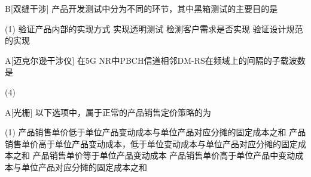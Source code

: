 \begin{choice}{B}[双缝干涉]
    产品开发测试中分为不同的环节，其中黑箱测试的主要目的是
    \begin{tasks}(1)
        \task 验证产品内部的实现方式
        \task 实现透明测试
        \task 检测客户需求是否实现
        \task 验证设计规范的实现
    \end{tasks}
\end{choice}


\begin{choice}{A}[迈克尔逊干涉仪]
    在5G NR中PBCH信道相邻DM-RS在频域上的间隔的子载波数是
    \begin{tasks}(4)
    \end{tasks}
\end{choice}


\begin{choice}{A}[光栅]
    以下选项中，属于正常的产品销售定价策略的为
    \begin{tasks}(1)
        \task 产品销售单价低于单位产品变动成本与单位产品对应分摊的固定成本之和
        \task 产品销售单价高于单位产品变动成本，低于单位变动成本与单位产品对应分摊的固定成本之和
        \task 产品销售单价等于单位产品变动成本
        \task 产品销售单价高于单位产品中变动成本与单位产品对应分摊的固定成本之和
    \end{tasks}
\end{choice}

